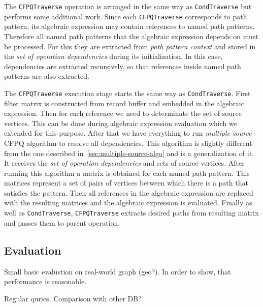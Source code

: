 The \lstinline{CFPQTraverse} operation is arranged in the same way as \lstinline{CondTraverse} but performs some additional work. Since each \lstinline{CFPQTraverse} corresponds to path pattern, its algebraic expression may contain references to named path patterns. Therefore all named path patterns that the algebraic expression depends on must be processed. For this they are extracted from \textit{path pattern context} and stored in the \textit{set of operation dependencies} during its initialization. In this case, dependencies are extracted recursively, so that references inside named path patterns are also extracted.

The \lstinline{CFPQTraverse} execution stage starts the same way as \lstinline{CondTraverse}. First filter matrix is constructed from record buffer and embedded in the algebraic expression. Then for each reference we need to determinate the set of source vertices. This can be done during algebraic expression evaluation which we extended for this purpose. After that we have everything to run \textit{multiple-source} CFPQ algorithm to resolve all dependencies. This algorithm is slightly different from the one described in~\autoref{sec:multiple-source-algo} and is a generalization of it. It receives the \textit{set of operation dependencies} and sets of source vertices. After running this algorithm a matrix is obtained for each named path pattern. This matrices represent a set of pairs of vertices between which there is a path that satisfies the pattern. Then all references in the algebraic expression are replaced with the resulting matrices and the algebraic expression is evaluated. Finally as well as \lstinline{CondTraverse}, \lstinline{CFPQTraverse} extracts desired paths from resulting matrix and passes them to parent operation.



\subsection{Evaluation}

Small basic evalustion on real-world graph (geo?).
In order to show, that performance is reasonable.

Regular quries. Comparison with other DB?

